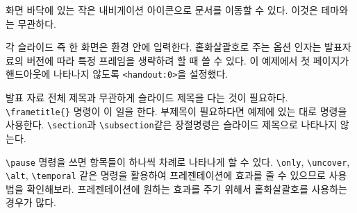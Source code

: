 화면 바닥에 있는 작은 내비게이션 아이콘으로 문서를 이동할 수 있다. 이것은 테마와는 무관하다.

각 슬라이드 즉 한 화면은  환경 안에 입력한다. 홑화살괄호로 주는 옵션 인자는 발표자료의 버전에 따라 특정 프레임을 생략하려 할 때 쓸 수 있다.
이 예제에서 첫 페이지가 핸드아웃에 나타나지 않도록 \verb|<handout:0>|\allowbreak 을 설정했다.

발표 자료 전체 제목과 무관하게 슬라이드 제목을 다는 것이 필요하다. 
\verb|\frametitle{}| 명령이 이 일을 한다. 부제목이 필요하다면 예제에 있는 대로  명령을 사용한다. 
\verb|\section|과 \verb|\subsection|같은 장절명령은 슬라이드 제목으로 나타나지 않는다.

\verb|\pause| 명령을 쓰면 항목들이 하나씩 차례로 나타나게 할 수 있다.
\verb|\only|, \verb|\uncover|, \verb|\alt|, \verb|\temporal| 같은 명령을 활용하여 프레젠테이션에 효과를 줄 수 있으므로 사용법을 확인해보라.
프레젠테이션에 원하는 효과를 주기 위해서 홑화살괄호를 사용하는 경우가 많다.

